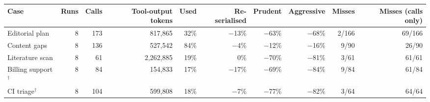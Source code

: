 \begin{tabular}{lrrrrrrrrr}
\toprule
Case & Runs & Calls & Tool-output tokens & Used & Re-serialised & Prudent & Aggressive & Misses & Misses (calls only) \\
\midrule
Editorial plan & 8 & 173 & 817{,}865 & 32\% & $-$13\% & $-$63\% & $-$68\% & 2/166 & 69/166 \\
Content gaps & 8 & 136 & 527{,}542 & 84\% & $-$4\% & $-$12\% & $-$16\% & 9/90 & 26/90 \\
Literature scan & 8 & 61 & 2{,}262{,}885 & 19\% & 0\% & $-$70\% & $-$81\% & 3/61 & 61/61 \\
Billing support$^\dagger$ & 8 & 84 & 154{,}833 & 17\% & $-$17\% & $-$69\% & $-$84\% & 9/84 & 61/84 \\
CI triage$^\dagger$ & 8 & 104 & 599{,}808 & 18\% & $-$7\% & $-$77\% & $-$82\% & 3/64 & 64/64 \\
\bottomrule
\end{tabular}

